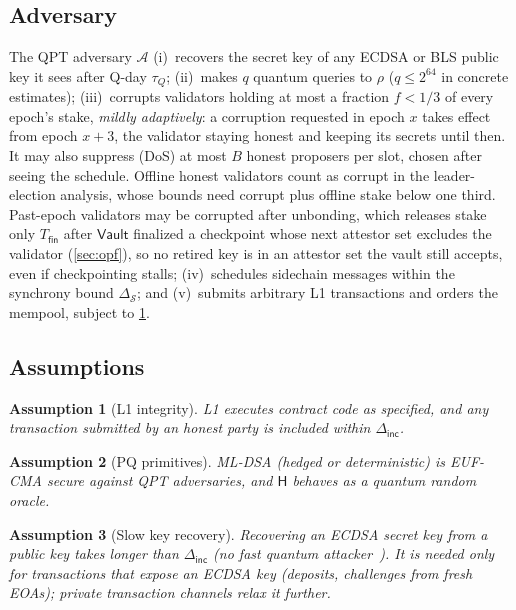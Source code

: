 \documentclass[10pt,journal,compsoc]{IEEEtran}
\theoremstyle{tplain}
\theoremstyle{tdef}
\newtheorem{assumption}{Assumption}
\theoremstyle{remark}
\newcommand{\Vault}{\mathsf{Vault}}
\newcommand{\Hash}{\mathsf{H}}
\newcommand{\RO}{\rho}
\begin{document}
\subsection{Adversary}
The QPT adversary $\mathcal{A}$ (i)~recovers the secret key of any ECDSA or BLS public key it sees after Q-day $\tau_Q$; (ii)~makes $q$ quantum queries to $\RO$ ($q\le 2^{64}$ in concrete estimates); (iii)~corrupts validators holding at most a fraction $f<1/3$ of every epoch's stake, \emph{mildly adaptively}: a corruption requested in epoch $x$ takes effect from epoch $x+3$, the validator staying honest and keeping its secrets until then. It may also suppress (DoS) at most $B$ honest proposers per slot, chosen after seeing the schedule. Offline honest validators count as corrupt in the leader-election analysis, whose bounds need corrupt plus offline stake below one third. Past-epoch validators may be corrupted after unbonding, which releases stake only $T_{\mathsf{fin}}$ after $\Vault$ finalized a checkpoint whose next attestor set excludes the validator (\cref{sec:opf}), so no retired key is in an attestor set the vault still accepts, even if checkpointing stalls; (iv)~schedules sidechain messages within the synchrony bound $\Delta_{\mathcal S}$; and (v)~submits arbitrary L1 transactions and orders the mempool, subject to \cref{asm:l1}.

\subsection{Assumptions}

\begin{assumption}[L1 integrity]\label{asm:l1}
L1 executes contract code as specified, and any transaction submitted by an honest party is included within $\Delta_{\mathsf{inc}}$.
\end{assumption}

\begin{assumption}[PQ primitives]\label{asm:pq}
ML-DSA (hedged or deterministic) is EUF-CMA secure against QPT adversaries, and $\Hash$ behaves as a quantum random oracle.
\end{assumption}

\begin{assumption}[Slow key recovery]\label{asm:slow}
Recovering an ECDSA secret key from a public key takes longer than $\Delta_{\mathsf{inc}}$ (no \emph{fast} quantum attacker~\cite{stewart2018committing}). It is needed only for transactions that \emph{expose} an ECDSA key (deposits, challenges from fresh EOAs); private transaction channels relax it further.
\end{assumption}
\end{document}
